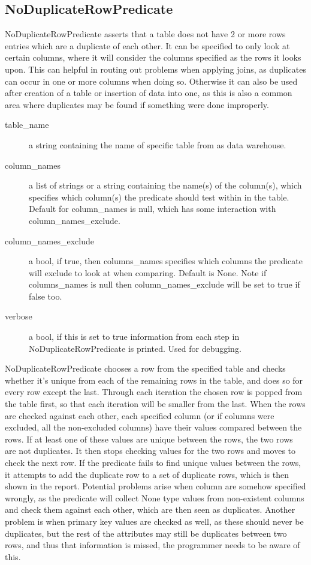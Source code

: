 \subsection{NoDuplicateRowPredicate}

NoDuplicateRowPredicate asserts that a table does not have 2 or more rows entries which are a duplicate of each other. It can be specified to only look at certain columns, where it will consider the columns specified as the rows it looks upon. This can helpful in routing out problems when applying joins, as duplicates can occur in one or more columns when doing so. Otherwise it can also be used after creation of a table or insertion of data into one, as this is also a common area where duplicates may be found if something were done improperly.
 

\begin{description}
\item [table\_name] a string containing the name of specific table from as data warehouse. 
\item [column\_names] a list of strings or a string containing the name(s) of the column(s), which specifies which column(s) the predicate should test within in the table. Default for column\_names is null, which has some interaction with column\_names\_exclude.
\item [column\_names\_exclude] a bool, if true, then columns\_names specifies which columns the predicate will exclude to look at when comparing. Default is None. Note if columns\_names is null then column\_names\_exclude will be set to true if false too.
\item [verbose] a bool, if this is set to true information from each step in NoDuplicateRowPredicate is printed. Used for debugging.
\end{description}

NoDuplicateRowPredicate chooses a row from the specified table and checks whether it's unique from each of the remaining rows in the table, and does so for every row except the last. Through each iteration the chosen row is popped from the table first, so that each iteration will be smaller from the last. When the rows are checked against each other, each specified column (or if columns were excluded, all the non-excluded columns) have their values compared between the rows. If at least one of these values are unique between the rows, the two rows are not duplicates. It then stops checking values for the two rows and moves to check the next row. If the predicate fails to find unique values between the rows, it attempts to add the duplicate row to a set of duplicate rows, which is then shown in the report. Potential problems arise when column are somehow specified wrongly, as the predicate will collect None type values from non-existent columns and check them against each other, which are then seen as duplicates. Another problem is when primary key values are checked as well, as these should never be duplicates, but the rest of the attributes may still be duplicates between two rows, and thus that information is missed, the programmer needs to be aware of this.